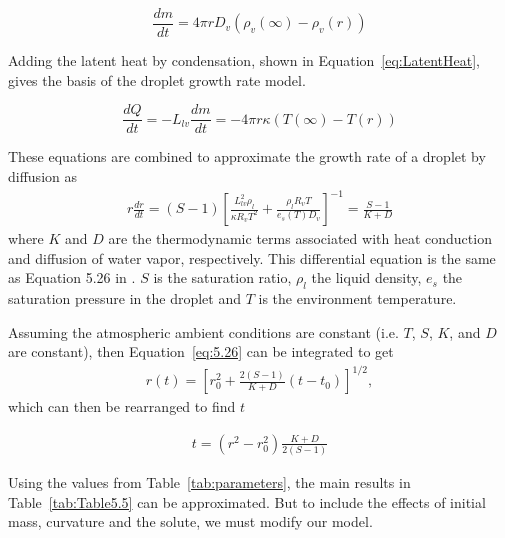 \documentclass[titlepage]{article}
\begin{document}
\begin{equation}
    \label{eq:Diffusion}
    \dfrac{dm}{dt}=4 \pi r D_{v} \left( \rho_{v}(\infty) - \rho_{v}(r) \right)
\end{equation}

Adding the latent heat by condensation, shown in
Equation~\eqref{eq:LatentHeat}, gives the basis of the droplet growth rate
model.

\begin{equation}
    \label{eq:LatentHeat}
    \dfrac{dQ}{dt}=-L_{lv}\dfrac{dm}{dt}=-4 \pi r \kappa \left( T(\infty) - T(r) \right)
\end{equation}

These equations are combined to approximate the growth rate of a droplet by
diffusion as
\begin{align}
    \label{eq:5.26}
    r \frac{dr}{dt} = (S - 1) \left[ \frac{L_{lv}^2 \rho_l}{\kappa R_v T^2} + \frac{\rho_l R_v T}{e_s(T) D_v} \right] ^{-1} = \frac{S - 1}{K + D}
\end{align}
where $K$ and $D$ are the thermodynamic terms associated with heat conduction
and diffusion of water vapor, respectively. This differential equation is the
same as Equation 5.26 in \cite{Mason}. $S$ is the saturation ratio, $\rho_l$
the liquid density, $e_s$ the saturation pressure in the droplet and $T$ is the
environment temperature.

Assuming the atmospheric ambient conditions are constant (i.e. $T$, $S$, $K$,
and $D$ are constant), then Equation~\eqref{eq:5.26} can be integrated to get
\begin{align}
    \label{eq:5.27}
    r(t) = \left[ r_0^2 + \frac{2(S -1)}{K + D}(t - t_0) \right] ^{1/2},
\end{align}
which can then be rearranged to find $t$

\begin{align}
    \label{eq:5.27T}
    t = (r^2 - r_0^2) \frac{K + D}{2(S - 1)}
\end{align}

Using the values from Table~\ref{tab:parameters}, the main results in
Table~\ref{tab:Table5.5} can be approximated. But to include the effects of
initial mass, curvature and the solute, we must modify our model.
\end{document}

